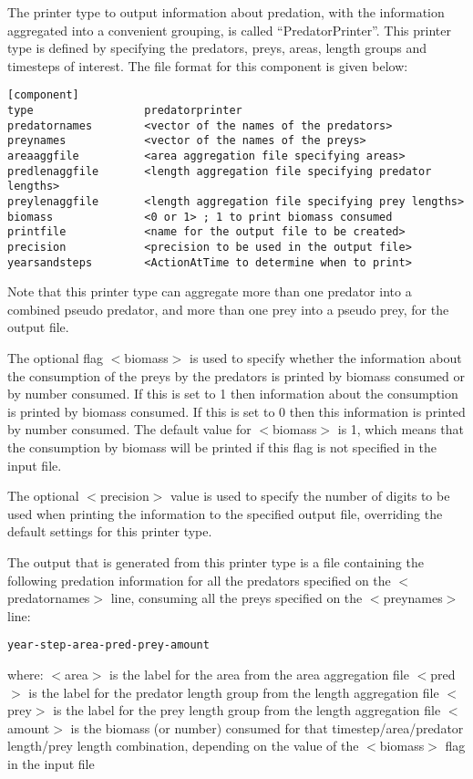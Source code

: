 \documentclass[]{book}
\begin{document}
The printer type to output information about predation, with the
information aggregated into a convenient grouping, is called
``PredatorPrinter''. This printer type is defined by specifying the
predators, preys, areas, length groups and timesteps of interest. The
file format for this component is given below:

\begin{verbatim}
[component]
type                 predatorprinter
predatornames        <vector of the names of the predators>
preynames            <vector of the names of the preys>
areaaggfile          <area aggregation file specifying areas>
predlenaggfile       <length aggregation file specifying predator lengths>
preylenaggfile       <length aggregation file specifying prey lengths>
biomass              <0 or 1> ; 1 to print biomass consumed
printfile            <name for the output file to be created>
precision            <precision to be used in the output file>
yearsandsteps        <ActionAtTime to determine when to print>
\end{verbatim}

Note that this printer type can aggregate more than one predator into a
combined pseudo predator, and more than one prey into a pseudo prey, for
the output file.

The optional flag \(<\)biomass\(>\) is used to specify whether the
information about the consumption of the preys by the predators is
printed by biomass consumed or by number consumed. If this is set to 1
then information about the consumption is printed by biomass consumed.
If this is set to 0 then this information is printed by number consumed.
The default value for \(<\)biomass\(>\) is 1, which means that the
consumption by biomass will be printed if this flag is not specified in
the input file.

The optional \(<\)precision\(>\) value is used to specify the number of
digits to be used when printing the information to the specified output
file, overriding the default settings for this printer type.

The output that is generated from this printer type is a file containing
the following predation information for all the predators specified on
the \(<\)predatornames\(>\) line, consuming all the preys specified on the
\(<\)preynames\(>\) line:

\begin{verbatim}
year-step-area-pred-prey-amount
\end{verbatim}

where: \(<\)area\(>\) is the label for the area from the area aggregation
file \(<\)pred\(>\) is the label for the predator length group from the
length aggregation file \(<\)prey\(>\) is the label for the prey length
group from the length aggregation file \(<\)amount\(>\) is the biomass (or
number) consumed for that timestep/area/predator length/prey length
combination, depending on the value of the \(<\)biomass\(>\) flag in the
input file
\end{document}
